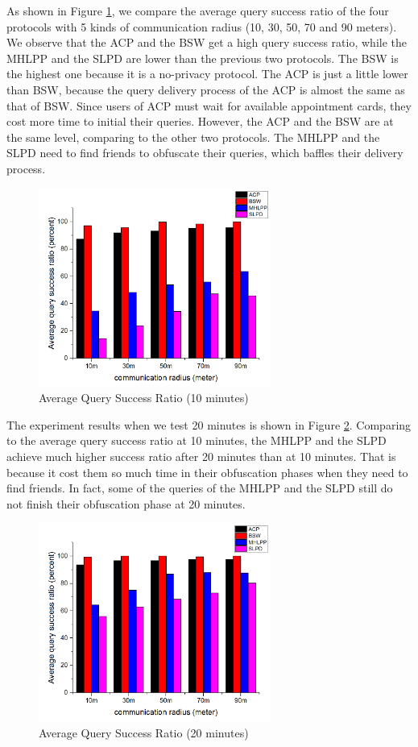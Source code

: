 \documentclass[conference]{IEEEtran}
\begin{document}
As shown in Figure \ref{fig:AverageQuerySuccessRatio10}, we compare the average query success ratio of the four protocols with 5 kinds of communication radius (10, 30, 50, 70 and 90 meters). We observe that the ACP and the BSW get a high query success ratio, while the MHLPP and the SLPD are lower than the previous two protocols. The BSW is the highest one because it is a no-privacy protocol. The ACP is just a little lower than BSW, because the query delivery process of the ACP is almost the same as that of BSW. Since users of ACP must wait for available appointment cards, they cost more time to initial their queries. However, the ACP and the BSW are at the same level, comparing to the other two protocols. The MHLPP and the SLPD need to find friends to obfuscate their queries, which baffles their delivery process.

\begin{figure} [H]
  \centering 
  \includegraphics[width=3in]{figures/F414AverageQuerySuccessRatio10minutes.png}
  \caption{Average Query Success Ratio (10 minutes)} 
  \label{fig:AverageQuerySuccessRatio10} %
\end{figure}

The experiment results when we test 20 minutes is shown in Figure \ref{fig:AverageQuerySuccessRatio20}. Comparing to the average query success ratio at 10 minutes, the MHLPP and the SLPD achieve much higher success ratio after 20 minutes than at 10 minutes. That is because it cost them so much time in their obfuscation phases when they need to find friends. In fact, some of the queries of the MHLPP and the SLPD still do not finish their obfuscation phase at 20 minutes.

\begin{figure} [H]
  \centering 
  \includegraphics[width=3in]{figures/F415AverageQuerySuccessRatio20minutes.png}
  \caption{Average Query Success Ratio (20 minutes)} 
  \label{fig:AverageQuerySuccessRatio20} %
\end{figure}
\end{document}
